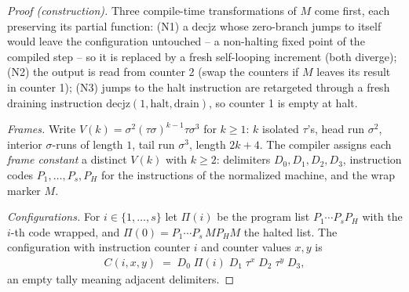 \begin{proof}[Proof (construction)]
    Three compile-time transformations of $M$ come first, each
    preserving its partial function: (N1) a $\mathrm{decjz}$ whose
    zero-branch jumps to itself would leave the configuration
    untouched -- a non-halting fixed point of the compiled step -- so it
    is replaced by a fresh self-looping increment (both diverge);
    (N2) the output is read from counter 2 (swap the counters if $M$
    leaves its result in counter 1); (N3) jumps to the halt
    instruction are retargeted through a fresh draining instruction
    $\mathrm{decjz}(1, \mathrm{halt}, \mathrm{drain})$, so counter 1 is
    empty at halt.

    \emph{Frames.} Write
    $V(k) = \sigma^2(\tau\sigma)^{k-1}\tau\sigma^3$ for $k \geq 1$:
    $k$ isolated $\tau$'s, head run $\sigma^2$, interior $\sigma$-runs
    of length $1$, tail run $\sigma^3$, length $2k+4$. The compiler
    assigns each \emph{frame constant} a distinct $V(k)$ with $k \geq 2$:
    delimiters $D_0, D_1, D_2, D_3$, instruction codes
    $P_1, \dots, P_s, P_H$ for the instructions of the normalized
    machine, and the wrap marker $M$.

    \emph{Configurations.} For $i \in \{1, \dots, s\}$ let $\Pi(i)$ be
    the program list $P_1 \cdots P_s P_H$ with the $i$-th code wrapped,
    and $\Pi(0) = P_1 \cdots P_s\, M P_H M$ the halted list. The
    configuration with instruction counter $i$ and counter values $x, y$
    is
    \begin{align}
        C(i, x, y) \;=\; D_0\;\Pi(i)\;D_1\;\tau^{x}\;D_2\;\tau^{y}\;D_3 ,
    \end{align}
    an empty tally meaning adjacent delimiters.


\end{proof}
